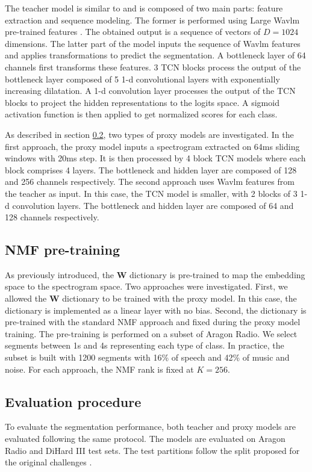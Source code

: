 The teacher model is similar to \cite{lebourdais22_interspeech} and is composed of two main parts: feature extraction and sequence modeling.
The former is performed using Large Wavlm pre-trained features \cite{chen2022wavlm}.
The obtained output is a sequence of vectors of $D=1024$ dimensions.
The latter part of the model inputs the sequence of Wavlm features and applies transformations to predict the segmentation.
A bottleneck layer of 64 channels first transforms these features.
3 TCN blocks process the output of the bottleneck layer \cite{bai_empirical_2018} composed of 5 1-d convolutional layers with exponentially increasing dilatation. 
A 1-d convolution layer processes the output of the TCN blocks to project the hidden representations to the logits space.
A sigmoid activation function is then applied to get normalized scores for each class.

As described in section \ref{}, two types of proxy models are investigated.
In the first approach, the proxy model inputs a spectrogram extracted on 64ms sliding windows with 20ms step.
It is then processed by 4 block TCN models where each block comprises 4 layers.
The bottleneck and hidden layer are composed of 128 and 256 channels respectively.
The second approach uses Wavlm features from the teacher as input.
In this case, the TCN model is smaller, with 2 blocks of 3 1-d convolution layers. 
The bottleneck and hidden layer are composed of 64 and 128 channels respectively.

\subsection{NMF pre-training}

As previously introduced, the $\mathbf{W}$ dictionary is pre-trained to map the embedding space to the spectrogram space.
Two approaches were investigated.
First, we allowed the $\mathbf{W}$ dictionary to be trained with the proxy model.
In this case, the dictionary is implemented as a linear layer with no bias.
Second, the dictionary is pre-trained with the standard NMF approach and fixed during the proxy model training.
The pre-training is performed on a subset of Aragon Radio.
We select segments between 1s and 4s representing each type of class.
In practice, the subset is built with 1200 segments with 16\% of speech and 42\% of music and noise.
For each approach, the NMF rank is fixed at $K=256$.


\subsection{Evaluation procedure}

To evaluate the segmentation performance, both teacher and proxy models are evaluated following the same protocol.
The models are evaluated on Aragon Radio and DiHard III test sets.
The test partitions follow the split proposed for the original challenges \cite{albayzin12,ryant2021dihard}.
